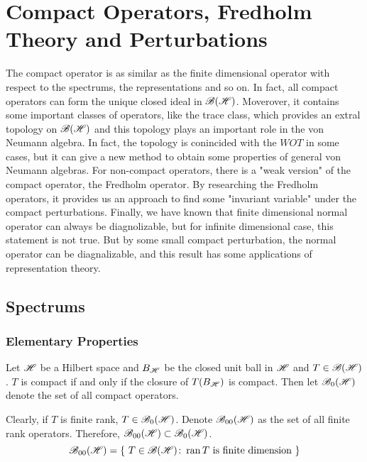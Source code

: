 \chapter{Compact Operators, Fredholm Theory and Perturbations}

The compact operator is as similar as the finite dimensional operator with respect to the spectrums, the representations and so on. In fact, all compact operators can form the unique closed ideal in $\mathscr{B(H)}$. Moverover, it contains some important classes of operators, like the trace class, which provides an extral topology on $\mathscr{B(H)}$ and this topology plays an important role in the von Neumann algebra. In fact, the topology is conincided with the $WOT$ in some cases, but it can give a new method to obtain some properties of general von Neumann algebras. For non-compact operators, there is a "weak version" of the compact operator, the Fredholm operator. By researching the Fredholm operators, it provides us an approach to find some "invariant variable" under the compact perturbations. Finally, we have known that finite dimensional normal operator can always be diagnolizable, but for infinite dimensional case, this statement is not true. But by some small compact perturbation, the normal operator can be diagnalizable, and this result has some applications of representation theory. 

\section{Spectrums}

\subsection{Elementary Properties}

\begin{defn}
	Let $\mathscr{H}$ be a Hilbert space and $B_{\mathscr{H}}$ be the closed unit ball in $\mathscr{H}$ and $T \in \mathscr{B(H)}$. $T$ is compact if and only if the closure of $T(B_{\mathscr{H}})$ is compact. Then let $\mathscr{B}_{0}\mathscr{(H)}$ denote the set of all compact operators.
\end{defn}
\begin{rem}
	Clearly, if $T$ is finite rank, $T \in \mathscr{B}_{0}\mathscr{(H)}$. Denote $\mathscr{B}_{00}\mathscr{(H)}$ as the set of all finite rank operators. Therefore, $\mathscr{B}_{00}\mathscr{(H)} \subset \mathscr{B}_{0}\mathscr{(H)}$.
	\begin{equation*}
		\mathscr{B}_{00}\mathscr{(H)} = \{~T \in \mathscr{B(H)} \colon \operatorname{ran}{T} \text{ is finite dimension}~\}
	\end{equation*}
\end{rem}

